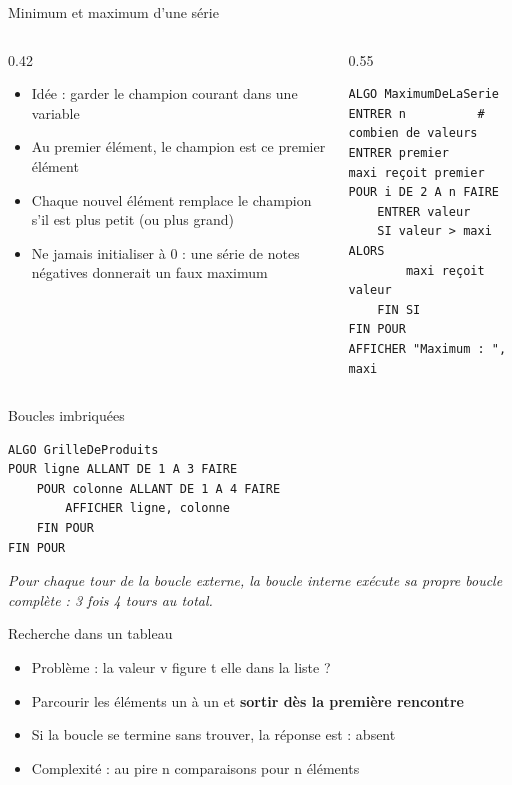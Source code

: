 \documentclass[aspectratio=169,11pt]{beamer}
\begin{document}
\begin{frame}[fragile]{Minimum et maximum d'une série}
\begin{columns}[t]
\begin{column}{0.42\textwidth}
\begin{itemize}
  \setlength{\itemsep}{1.5pt}\setlength{\parskip}{0pt}
  \item Idée : garder le champion courant dans une variable
  \item Au premier élément, le champion est ce premier élément
  \item Chaque nouvel élément remplace le champion s'il est plus petit (ou plus grand)
  \item Ne jamais initialiser à 0 : une série de notes négatives donnerait un faux maximum
\end{itemize}
\end{column}
\hspace{0.02\textwidth}
\begin{column}{0.55\textwidth}
\begin{lstlisting}[style=pysmall]
ALGO MaximumDeLaSerie
ENTRER n          # combien de valeurs
ENTRER premier
maxi reçoit premier
POUR i DE 2 A n FAIRE
    ENTRER valeur
    SI valeur > maxi ALORS
        maxi reçoit valeur
    FIN SI
FIN POUR
AFFICHER "Maximum : ", maxi
\end{lstlisting}
\end{column}
\end{columns}
\end{frame}

\begin{frame}[fragile]{Boucles imbriquées}

\begin{lstlisting}[style=py]
ALGO GrilleDeProduits
POUR ligne ALLANT DE 1 A 3 FAIRE
    POUR colonne ALLANT DE 1 A 4 FAIRE
        AFFICHER ligne, colonne
    FIN POUR
FIN POUR
\end{lstlisting}
\vspace{0.5pt}

{\small\color{PyGris}\itshape Pour chaque tour de la boucle externe, la boucle interne exécute sa propre boucle complète : 3 fois 4 tours au total.}

\end{frame}

\begin{frame}{Recherche dans un tableau}
\begin{itemize}
  \item Problème : la valeur v figure t elle dans la liste ?
  \item Parcourir les éléments un à un et \textbf{sortir dès la première rencontre}
  \item Si la boucle se termine sans trouver, la réponse est : absent
  \item Complexité : au pire n comparaisons pour n éléments
\end{itemize}
\end{frame}
\end{document}
